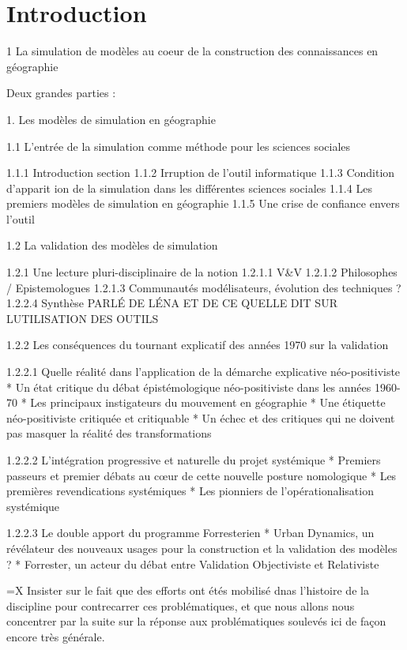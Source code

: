 
\chapter{Introduction}

\startcontents[chapters]
\Mprintcontents


1 La simulation de modèles au coeur de la construction des connaissances en géographie

Deux grandes parties : 

1. Les modèles de simulation en géographie

1.1 L'entrée de la simulation comme méthode pour les sciences sociales
	
	1.1.1 Introduction section
	1.1.2 Irruption de l'outil informatique
	1.1.3 Condition d'apparit\tabularnewline
	ion de la simulation dans les différentes sciences sociales
	1.1.4 Les premiers modèles de simulation en géographie
	1.1.5 Une crise de confiance envers l'outil

1.2 La validation des modèles de simulation

	1.2.1 Une lecture pluri-disciplinaire de la notion
			1.2.1.1 V&V
			1.2.1.2 Philosophes / Epistemologues
			1.2.1.3 Communautés modélisateurs, évolution des techniques
				?
			1.2.2.4 Synthèse
			PARLÉ DE LÉNA ET DE CE QUELLE DIT SUR LUTILISATION DES OUTILS

	1.2.2 Les conséquences du tournant explicatif des années 1970 sur la validation

		1.2.2.1 Quelle réalité dans l'application de la démarche explicative néo-positiviste
			* Un état critique du débat épistémologique néo-positiviste dans les années 1960-70
			* Les principaux instigateurs du mouvement en géographie
			* Une étiquette néo-positiviste critiquée et critiquable
			* Un échec et des critiques qui ne doivent pas masquer la réalité des transformations

		1.2.2.2 L'intégration progressive et naturelle du projet systémique
			* Premiers passeurs et premier débats au cœur de cette nouvelle posture nomologique
			* Les premières revendications systémiques
			* Les pionniers de l'opérationalisation systémique

		1.2.2.3 Le double apport du programme Forresterien 
			* Urban Dynamics, un révélateur des nouveaux usages pour la construction et la validation des modèles ?
			* Forrester, un acteur du débat entre Validation Objectiviste et Relativiste

			=X Insister sur le fait que des efforts ont étés mobilisé dnas l'histoire de la discipline pour contrecarrer ces problématiques, et que nous allons nous concentrer par la suite sur la réponse aux problématiques soulevés ici de façon encore très générale.

